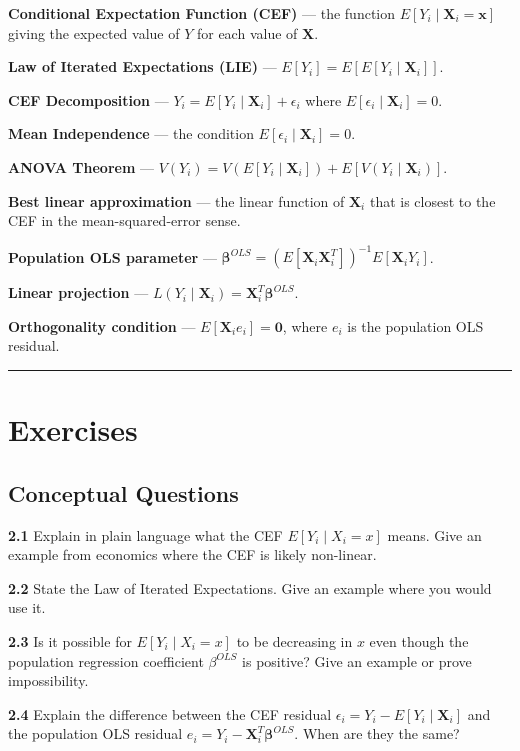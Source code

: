 \textbf{Conditional Expectation Function (CEF)} --- the function $E[Y_i \mid \mathbf{X}_i = \mathbf{x}]$ giving the expected value of $Y$ for each value of $\mathbf{X}$.

\textbf{Law of Iterated Expectations (LIE)} --- $E[Y_i] = E[E[Y_i \mid \mathbf{X}_i]]$.

\textbf{CEF Decomposition} --- $Y_i = E[Y_i \mid \mathbf{X}_i] + \epsilon_i$ where $E[\epsilon_i \mid \mathbf{X}_i] = 0$.

\textbf{Mean Independence} --- the condition $E[\epsilon_i \mid \mathbf{X}_i] = 0$.

\textbf{ANOVA Theorem} --- $V(Y_i) = V(E[Y_i \mid \mathbf{X}_i]) + E[V(Y_i \mid \mathbf{X}_i)]$.

\textbf{Best linear approximation} --- the linear function of $\mathbf{X}_i$ that is closest to the CEF in the mean-squared-error sense.

\textbf{Population OLS parameter} --- $\boldsymbol{\beta}^{OLS} = (E[\mathbf{X}_i \mathbf{X}_i^T])^{-1} E[\mathbf{X}_i Y_i]$.

\textbf{Linear projection} --- $L(Y_i \mid \mathbf{X}_i) = \mathbf{X}_i^T \boldsymbol{\beta}^{OLS}$.

\textbf{Orthogonality condition} --- $E[\mathbf{X}_i e_i] = \mathbf{0}$, where $e_i$ is the population OLS residual.

\medskip\hrule\medskip

\section{Exercises}

\subsection{Conceptual Questions}

\textbf{2.1} Explain in plain language what the CEF $E[Y_i \mid X_i = x]$ means. Give an example from economics where the CEF is likely non-linear.

\textbf{2.2} State the Law of Iterated Expectations. Give an example where you would use it.

\textbf{2.3} Is it possible for $E[Y_i \mid X_i = x]$ to be decreasing in $x$ even though the population regression coefficient $\beta^{OLS}$ is positive? Give an example or prove impossibility.

\textbf{2.4} Explain the difference between the CEF residual $\epsilon_i = Y_i - E[Y_i \mid \mathbf{X}_i]$ and the population OLS residual $e_i = Y_i - \mathbf{X}_i^T \boldsymbol{\beta}^{OLS}$. When are they the same?

